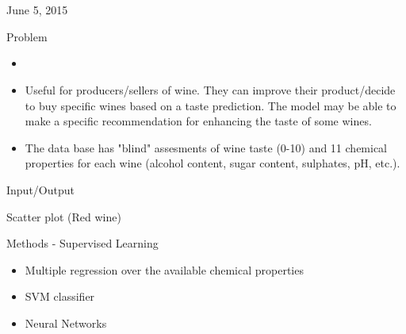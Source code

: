 \documentclass{mine}
\begin{document}
{\\
\\
}{June 5, 2015}

\begin{slide}{Problem}
    \vspace{3cm}
    \begin{itemize}
        \item{}
        \vspace{1cm}
        \item{Useful for producers/sellers of wine. They can improve their product/decide to buy specific wines
              based on a taste prediction. The model may be able to make a specific recommendation for enhancing the
              taste of some wines.}
       \vspace{1cm}
       \item{The data base has "blind" assesments of wine taste (0-10) and 11 chemical properties for each wine (alcohol
           content, sugar content, sulphates, pH, etc.).}
    \end{itemize}
\end{slide}

\begin{slide}{Input/Output}
\begin{center}
\end{center}
\end{slide}

\begin{slide}{Scatter plot (Red wine)}
    \begin{center}
    \end{center}
\end{slide}

\begin{slide}{Methods - Supervised Learning}
    \vspace{3cm}
    \begin{itemize}
        \item{Multiple regression over the available chemical properties}
        \vspace{1cm}
        \item{SVM classifier}
        \vspace{1cm}
        \item{Neural Networks}
    \end{itemize}
\end{slide}
\end{document}
